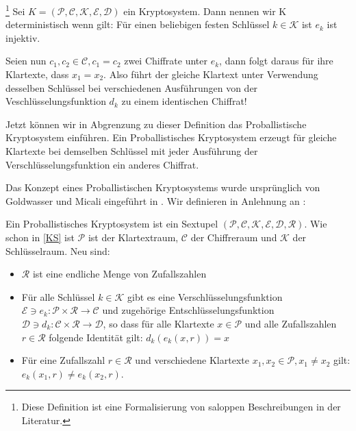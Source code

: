 \documentclass[12pt,a4paper]{scrartcl}	%
\begin{document}
\begin{theorem}\footnote{Diese Definition ist eine Formalisierung von saloppen Beschreibungen in der Literatur.}
Sei $K = (\mathcal{P},\mathcal{C},\mathcal{K},\mathcal{E},\mathcal{D})$ ein Kryptosystem. Dann nennen wir K deterministisch wenn gilt: Für einen beliebigen festen Schlüssel $k\in\mathcal{K}$ ist $e_k$ ist injektiv. %
\end{theorem}

Seien nun $c_1,c_2\in\mathcal{C}, c_1= c_2$ zwei Chiffrate unter $e_k$, dann folgt daraus für ihre Klartexte, dass $x_1= x_2$. Also führt der gleiche Klartext unter Verwendung desselben Schlüssel bei verschiedenen Ausführungen von der Veschlüsselungsfunktion $d_k$ zu einem identischen Chiffrat!

Jetzt können wir in Abgrenzung zu dieser Definition das Proballistische Kryptosystem einführen. Ein Proballistisches Kryptosystem erzeugt für gleiche Klartexte bei demselben Schlüssel mit jeder Ausführung der Verschlüsselungsfunktion ein
 anderes Chiffrat.

Das Konzept eines Proballistischen Kryptosystems wurde ursprünglich von Goldwasser und Micali eingeführt in \cite{goldwasser1984probabilistic}. Wir definieren in Anlehnung an \cite[p.345]{delfs2002introduction}:

\begin{theorem}
\label{PKS}
	Ein Proballistisches Kryptosystem ist ein Sextupel $(\mathcal{P},\mathcal{C},\mathcal{K},\mathcal{E},\mathcal{D},\mathcal{R})$. Wie schon in \ref{KS} ist $\mathcal{P}$ ist der Klartextraum, $\mathcal{C}$ der Chiffreraum und $\mathcal{K}$ der Schlüsselraum. Neu sind:
	\begin{itemize}
	\item $\mathcal{R}$ ist eine endliche Menge von Zufallszahlen
	\item Für alle Schlüssel $k\in \mathcal{K}$ gibt es eine Verschlüsselungsfunktion $\mathcal{E}\ni e_k:\mathcal{P}\times\mathcal{R}\rightarrow\mathcal{C}$ und zugehörige Entschlüsselungsfunktion $\mathcal{D}\ni d_k:\mathcal{C}\times\mathcal{R}\rightarrow\mathcal{D}$, so dass für alle Klartexte $x\in\mathcal{P}$ und alle Zufallszahlen $r\in\mathcal{R}$ folgende Identität gilt: $d_k(e_k(x,r)) = x$ 
	\item Für eine Zufallszahl $r\in\mathcal{R}$ und verschiedene Klartexte $x_1,x_2\in\mathcal{P}, x_1\neq x_2$ gilt: $e_k(x_1,r)\neq e_k(x_2,r)$.
	
	\end{itemize}
\end{theorem}
\end{document}
